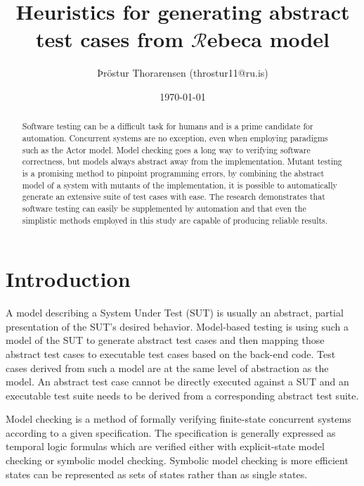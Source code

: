 \documentclass{article}
\begin{document}
\newcommand{\Rebeca}{$\mathcal{R}$ebeca\xspace}


\title{Heuristics for generating abstract test cases from \Rebeca model}
\author{Þröstur Thorarensen (throstur11@ru.is)}
\date{\today}
\maketitle

\begin{abstract}
	Software testing can be a difficult task for humans and is a prime candidate for automation. Concurrent systems are no exception, even when employing paradigms such as the Actor model. Model checking goes a long way to verifying software correctness, but models always abstract away from the implementation. Mutant testing is a promising method to pinpoint programming errors, by combining the abstract model of a system with mutants of the implementation, it is possible to automatically generate an extensive suite of test cases with ease. The research demonstrates that software testing can easily be supplemented by automation and that even the simplistic methods employed in this study are capable of producing reliable results.
\end{abstract}

\newpage
\tableofcontents
\newpage

	\section{Introduction}
		A model describing a System Under Test (SUT) is usually an abstract, partial presentation of the SUT's desired behavior. Model-based testing is using such a model of the SUT to generate abstract test cases and then mapping those abstract test cases to executable test cases based on the back-end code. Test cases derived from such a model are at the same level of abstraction as the model. An abstract test case cannot be directly executed against a SUT and an executable test suite needs to be derived from a corresponding abstract test suite.

		Model checking is a method of formally verifying finite-state concurrent systems according to a given specification. The specification is generally expressed as temporal logic formulas which are verified either with explicit-state model checking or symbolic model checking. Symbolic model checking is more efficient states can be represented as sets of states rather than as single states.
\end{document}
